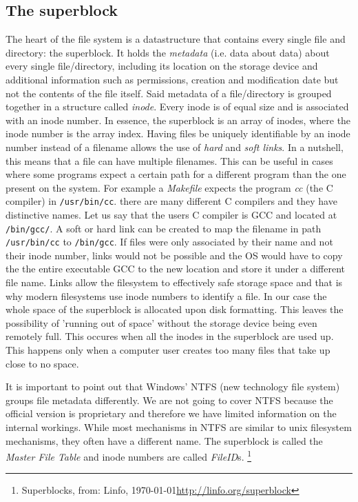 \subsection{The superblock}

The heart of the file system is a datastructure that contains every single file and directory: the
superblock. It holds the \textit{metadata} (i.e. data about data) about every single file/directory,
including its location on the storage device and additional information such as permissions, creation
and modification date but not the contents of the file itself. Said metadata of a file/directory is
grouped together in a structure called \textit{inode}. Every inode is of equal size and is associated
with an inode number. In essence, the superblock is an array of inodes, where the inode number is the
array index. Having files be uniquely identifiable by an inode number instead of a filename allows 
the use of \textit{hard} and \textit{soft links}. In a nutshell, this means that a file can have multiple filenames.
This can be useful in cases where some programs expect a certain path for a different program than the
one present on the system. For example a \textit{Makefile} expects the program \textit{cc} (the C compiler) in
\texttt{/usr/bin/cc}. there are many different C compilers and they have distinctive names. Let us say that the
users C compiler is GCC and located at \texttt{/bin/gcc/}. A soft or hard link can be created to map the
filename in path \texttt{/usr/bin/cc} to \texttt{/bin/gcc}. If files were only associated by their name and not 
their inode number, links would not be possible and the OS would have to copy the the entire
executable GCC to the new location and store it under a different file name. Links allow the
filesystem to effectively safe storage space and that is why modern filesystems use inode numbers to
identify a file. In our case the whole space of the superblock is allocated upon disk formatting.
This leaves the possibility of 'running out of space' without the storage device being even remotely
full. This occures when all the inodes in the superblock are used up. This happens only when a
computer user creates too many files that take up close to no space.

It is important to point out that Windows' NTFS (new technology file system) groups file metadata differently. 
We are not going to cover NTFS because the official version is proprietary and therefore we have limited 
information on the internal workings. While most mechanisms in NTFS are similar to
unix filesystem mechanisms, they often have a different name. The superblock is called the \textit{Master
File Table} and inode numbers are called \textit{FileID}s. \footnote{Superblocks, from: Linfo, \today  \url{http://linfo.org/superblock}}

